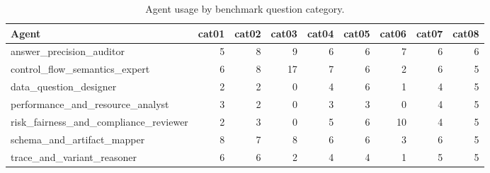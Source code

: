 \begin{table}
\caption{Agent usage by benchmark question category.}
\label{tab:agent-usage-by-category}
\begin{tabular}{lrrrrrrrr}
\hline
Agent & cat01 & cat02 & cat03 & cat04 & cat05 & cat06 & cat07 & cat08 \\
\hline
answer\_precision\_auditor & 5 & 8 & 9 & 6 & 6 & 7 & 6 & 6 \\
control\_flow\_semantics\_expert & 6 & 8 & 17 & 7 & 6 & 2 & 6 & 5 \\
data\_question\_designer & 2 & 2 & 0 & 4 & 6 & 1 & 4 & 5 \\
performance\_and\_resource\_analyst & 3 & 2 & 0 & 3 & 3 & 0 & 4 & 5 \\
risk\_fairness\_and\_compliance\_reviewer & 2 & 3 & 0 & 5 & 6 & 10 & 4 & 5 \\
schema\_and\_artifact\_mapper & 8 & 7 & 8 & 6 & 6 & 3 & 6 & 5 \\
trace\_and\_variant\_reasoner & 6 & 6 & 2 & 4 & 4 & 1 & 5 & 5 \\
\hline
\end{tabular}
\end{table}
